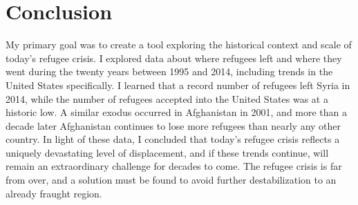 \documentclass{article}
\begin{document}
\section{Conclusion}

\noindent My primary goal was to create a tool exploring the historical context and scale of today's refugee crisis. I explored data about where refugees left and where they went during the twenty years between 1995 and 2014, including trends in the United States specifically. I learned that a record number of refugees left Syria in 2014, while the number of refugees accepted into the United States was at a historic low. A similar exodus occurred in Afghanistan in 2001, and more than a decade later Afghanistan continues to lose more refugees than nearly any other country. In light of these data, I concluded that today's refugee crisis reflects a uniquely devastating level of displacement, and if these trends continue, will remain an extraordinary challenge for decades to come. The refugee crisis is far from over, and a solution must be found to avoid further destabilization to an already fraught region.
\end{document}
